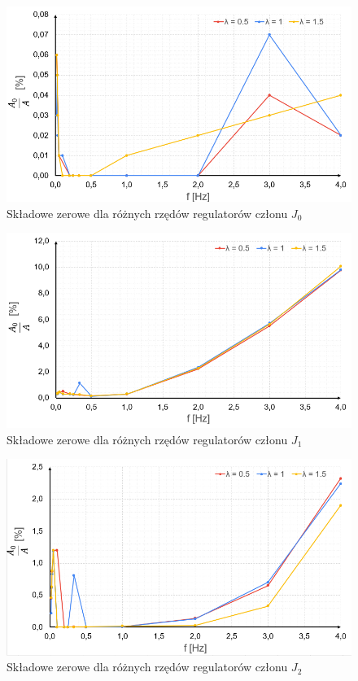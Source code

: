 \documentclass[journal,twoside,web]{ieeecolor}
\begin{document}
\begin{figure}[ht]
	\centering
	\includegraphics[width=1\linewidth]{../figs/1}
	\caption{Składowe zerowe dla różnych rzędów regulatorów członu $J_0$}
	\label{fig:1}
\end{figure}

\begin{figure}[ht]
	\centering
	\includegraphics[width=1\linewidth]{../figs/2}
	\caption{Składowe zerowe dla różnych rzędów regulatorów członu $J_1$}
	\label{fig:2}
\end{figure}

\begin{figure}[ht]
	\centering
	\includegraphics[width=1\linewidth]{../figs/3}
	\caption{Składowe zerowe dla różnych rzędów regulatorów członu $J_2$}
	\label{fig:3}
\end{figure}
\end{document}
